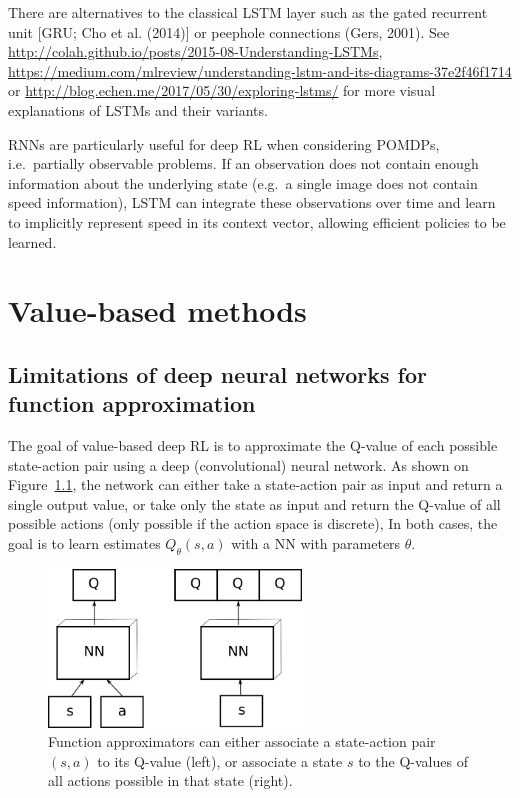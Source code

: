 \documentclass[
  letterpaper,
  DIV=11,
  numbers=noendperiod]{scrreprt}
\begin{document}
There are alternatives to the classical LSTM layer such as the gated
recurrent unit {[}GRU; Cho et al. (2014){]} or peephole connections
(Gers, 2001). See
\url{http://colah.github.io/posts/2015-08-Understanding-LSTMs},
\url{https://medium.com/mlreview/understanding-lstm-and-its-diagrams-37e2f46f1714}
or \url{http://blog.echen.me/2017/05/30/exploring-lstms/} for more
visual explanations of LSTMs and their variants.

RNNs are particularly useful for deep RL when considering POMDPs,
i.e.~partially observable problems. If an observation does not contain
enough information about the underlying state (e.g.~a single image does
not contain speed information), LSTM can integrate these observations
over time and learn to implicitly represent speed in its context vector,
allowing efficient policies to be learned.


\hypertarget{value-based-methods}{%
\chapter{Value-based methods}\label{value-based-methods}}

\hypertarget{limitations-of-deep-neural-networks-for-function-approximation}{%
\section{Limitations of deep neural networks for function
approximation}\label{limitations-of-deep-neural-networks-for-function-approximation}}

The goal of value-based deep RL is to approximate the Q-value of each
possible state-action pair using a deep (convolutional) neural network.
As shown on Figure~\ref{fig-functionapprox2}, the network can either
take a state-action pair as input and return a single output value, or
take only the state as input and return the Q-value of all possible
actions (only possible if the action space is discrete), In both cases,
the goal is to learn estimates \(Q_\theta(s, a)\) with a NN with
parameters \(\theta\).

\begin{figure}

{\centering \includegraphics[width=0.6\textwidth,height=\textheight]{./img/functionapprox.png}

}

\caption{\label{fig-functionapprox2}Function approximators can either
associate a state-action pair \((s, a)\) to its Q-value (left), or
associate a state \(s\) to the Q-values of all actions possible in that
state (right).}

\end{figure}
\end{document}
